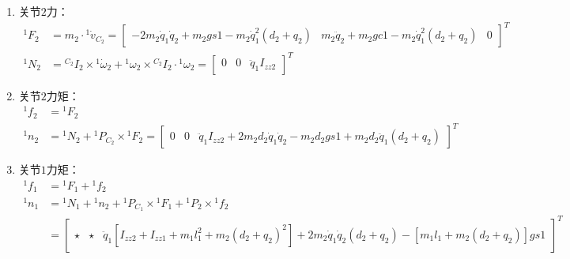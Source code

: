 \documentclass[
12pt, %
a4paper, 
oneside, %
]{scrartcl}
\begin{document}
{\begin{enumerate}
\begin{align*}
{}^1 \dot{v}_2 &= {}^1 \dot{v}_1 + {}^1 \dot{\omega}_1 \times {}^1 P_2 + {}^1 \omega_1 \times ({}^1 \omega_1 \times {}^1 P_2) + \ddot{q}_2 \cdot {}^1 Z_2 + 2\dot{q}_2 \cdot {}^1 \omega_1 \times {}^1 Z_2 \\
&= \begin{bmatrix} -\ddot{q}_1 q_2 - 2\dot{q}_1 \dot{q}_2 + gs1 & -\dot{q}_1^2 q_2 + {\ddot{q}_2}^2 + gc1 & 0 \end{bmatrix}^T \\
{}^1 \dot{v}_{C_2} &= {}^1 \dot{v}_2 + {}^1 \dot{\omega}_2 \times {}^1 P_{C_2} + {}^1 \omega_2 \times ({}^1 \omega_2 \times {}^1 P_{C_2}) \\
&= \begin{bmatrix} -2\dot{q}_1 \dot{q}_2 + gs1 - \ddot{q}_1(d_2 + q_2) & \ddot{q}_2 + gc1 - \dot{q}_1^2(d_2 + q_2) & 0 \end{bmatrix}^T
\end{align*}
\item 关节$ 2 $力：
\begin{align*}
{}^1 F_2 &= m_2 \cdot {}^1 \dot{v}_{C_2} = \begin{bmatrix} -2m_2 \dot{q}_1 \dot{q}_2 + m_2 gs1 - m_2 \dot{q}_1^2 (d_2 + q_2) & m_2 \ddot{q}_2 + m_2 gc1 - m_2 \dot{q}_1^2 (d_2 + q_2) & 0 \end{bmatrix}^T \\
{}^1 N_2 &= {}^{C_2}I_2 \times {}^1 \dot{\omega}_2 + {}^1 \omega_2 \times {}^{C_2}I_2 \cdot {}^1 \omega_2 = \begin{bmatrix} 0 & 0 & \ddot{q}_1 I_{zz2} \end{bmatrix}^T
\end{align*}
\item 关节$ 2 $力矩：
\begin{align*}
{}^1 f_2 &= {}^1 F_2 \\
{}^1 n_2 &= {}^1 N_2 + {}^1 P_{C_2} \times {}^1 F_2 = \begin{bmatrix} 0 & 0 & \ddot{q}_1 I_{zz2} + 2m_2 d_2 \dot{q}_1 \dot{q}_2 - m_2 d_2 gs1 + m_2 d_2 \ddot{q}_1 (d_2 + q_2) \end{bmatrix}^T
\end{align*}
\item 关节$ 1 $力矩：
\begin{align*}
{}^1 f_1 &= {}^1 F_1 + {}^1 f_2 \\
{}^1 n_1 &= {}^1 N_1 + {}^1 n_2 + {}^1 P_{C_1} \times {}^1 F_1 + {}^1 P_2 \times {}^1 f_2 \\
&= \begin{bmatrix} \star & \star & \ddot{q}_1[I_{zz2} + I_{zz1} + m_1 l_1^2 + m_2(d_2 + q_2)^2] + 2m_2 \dot{q}_1 \dot{q}_2(d_2 + q_2) - [m_1 l_1 + m_2(d_2 + q_2)]gs1 \end{bmatrix}^T

\end{align*}
\end{enumerate}}
\end{document}

